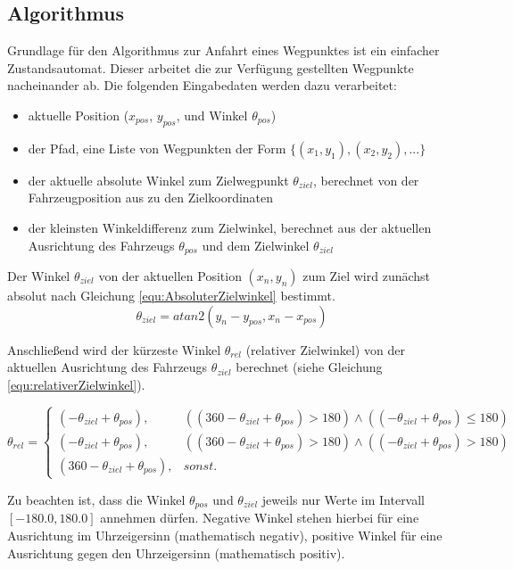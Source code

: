 \subsection{Algorithmus}
Grundlage für den Algorithmus zur Anfahrt eines Wegpunktes ist ein einfacher Zustandsautomat. Dieser arbeitet die zur Verfügung gestellten Wegpunkte nacheinander ab. Die folgenden Eingabedaten werden dazu verarbeitet:
\begin{itemize}
\item aktuelle Position ($x_{pos}$, $y_{pos}$, und Winkel $ \theta_{pos} $)
\item der Pfad, eine Liste von Wegpunkten der Form $ \{(x_1, y_1), (x_2, y_2), ...\} $
\item der aktuelle absolute Winkel zum Zielwegpunkt $\theta_{ziel}$, berechnet von der Fahrzeugposition aus zu den Zielkoordinaten
\item der kleinsten Winkeldifferenz zum Zielwinkel, berechnet aus der aktuellen Ausrichtung des Fahrzeugs $\theta_{pos}$ und dem Zielwinkel $\theta_{ziel}$
\end{itemize}

Der Winkel $\theta_{ziel}$ von der aktuellen Position $(x_n, y_n)$ zum Ziel wird zunächst absolut nach Gleichung  \ref{equ:AbsoluterZielwinkel} bestimmt.
\begin{equation}
\theta_{ziel} = atan2(y_n - y_{pos}, x_n - x_{pos})
\label{equ:AbsoluterZielwinkel}
\end{equation}

Anschließend wird der kürzeste Winkel $\theta_{rel}$ (relativer Zielwinkel) von der aktuellen Ausrichtung des Fahrzeugs $\theta_{ziel}$ berechnet (siehe Gleichung \ref{equ:relativerZielwinkel}).

\begin{equation}
\theta_{rel} = \left\{
\begin{array}{ll}
(-\theta_{ziel} + \theta_{pos}) , & ((360 - \theta_{ziel} + \theta_{pos}) > 180) \wedge ((-\theta_{ziel} + \theta_{pos}) \leq 180) \\
(-\theta_{ziel} + \theta_{pos}) , & ((360 - \theta_{ziel} + \theta_{pos}) > 180) \wedge ((-\theta_{ziel} + \theta_{pos}) > 180) \\
(360 - \theta_{ziel} + \theta_{pos}), & sonst.
\end{array}
\right.
\label{equ:relativerZielwinkel}
\end{equation}

Zu beachten ist, dass die Winkel $\theta_{pos}$ und $\theta_{ziel}$ jeweils nur Werte im Intervall $[-180.0, 180.0]$ annehmen dürfen. Negative Winkel stehen hierbei für eine Ausrichtung im Uhrzeigersinn (mathematisch negativ), positive Winkel für eine Ausrichtung gegen den Uhrzeigersinn (mathematisch positiv).


